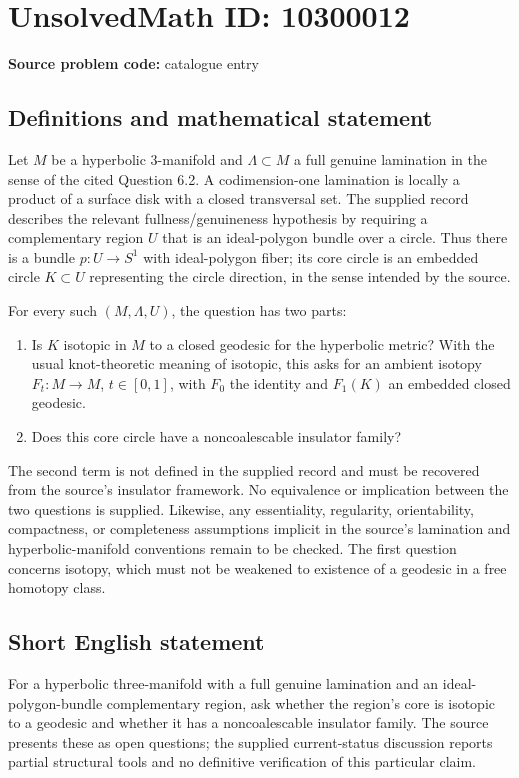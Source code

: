 \documentclass[11pt]{article}
\begin{document}
\section*{UnsolvedMath ID: 10300012}
\textbf{Source problem code:} catalogue entry
\subsection{Definitions and mathematical statement}
Let \(M\) be a hyperbolic \(3\)-manifold and \(\Lambda\subset M\) a full genuine lamination in the sense of the cited Question 6.2. A codimension-one lamination is locally a product of a surface disk with a closed transversal set. The supplied record describes the relevant fullness/genuineness hypothesis by requiring a complementary region \(U\) that is an ideal-polygon bundle over a circle. Thus there is a bundle \(p:U\to S^1\) with ideal-polygon fiber; its core circle is an embedded circle \(K\subset U\) representing the circle direction, in the sense intended by the source.

For every such \((M,\Lambda,U)\), the question has two parts:
\begin{enumerate}
\item Is \(K\) isotopic in \(M\) to a closed geodesic for the hyperbolic metric? With the usual knot-theoretic meaning of isotopic, this asks for an ambient isotopy \(F_t:M\to M\), \(t\in[0,1]\), with \(F_0\) the identity and \(F_1(K)\) an embedded closed geodesic.
\item Does this core circle have a noncoalescable insulator family?
\end{enumerate}
The second term is not defined in the supplied record and must be recovered from the source's insulator framework. No equivalence or implication between the two questions is supplied. Likewise, any essentiality, regularity, orientability, compactness, or completeness assumptions implicit in the source's lamination and hyperbolic-manifold conventions remain to be checked. The first question concerns isotopy, which must not be weakened to existence of a geodesic in a free homotopy class.
\subsection{Short English statement}
For a hyperbolic three-manifold with a full genuine lamination and an ideal-polygon-bundle complementary region, ask whether the region's core is isotopic to a geodesic and whether it has a noncoalescable insulator family. The source presents these as open questions; the supplied current-status discussion reports partial structural tools and no definitive verification of this particular claim.
\end{document}
